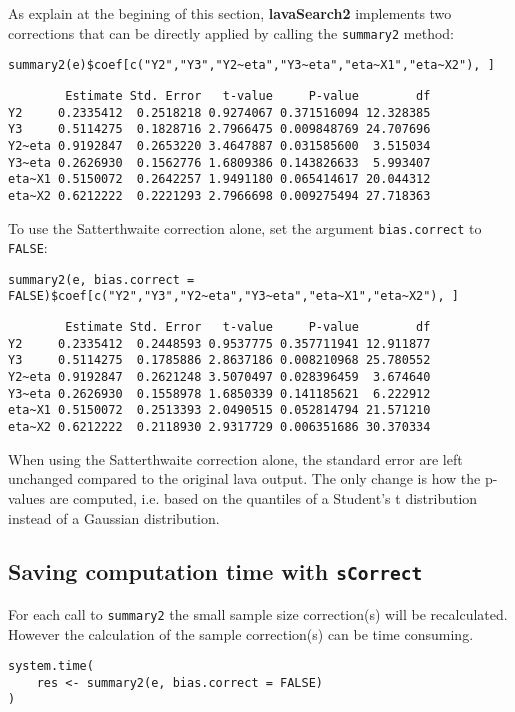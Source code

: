 \documentclass[12pt]{article}
\begin{document}
As explain at the begining of this section, \textbf{lavaSearch2} implements
two corrections that can be directly applied by calling the \texttt{summary2}
method:
\lstset{language=r,label= ,caption= ,captionpos=b,numbers=none}
\begin{lstlisting}
summary2(e)$coef[c("Y2","Y3","Y2~eta","Y3~eta","eta~X1","eta~X2"), ]
\end{lstlisting}

\begin{verbatim}
        Estimate Std. Error   t-value     P-value        df
Y2     0.2335412  0.2518218 0.9274067 0.371516094 12.328385
Y3     0.5114275  0.1828716 2.7966475 0.009848769 24.707696
Y2~eta 0.9192847  0.2653220 3.4647887 0.031585600  3.515034
Y3~eta 0.2626930  0.1562776 1.6809386 0.143826633  5.993407
eta~X1 0.5150072  0.2642257 1.9491180 0.065414617 20.044312
eta~X2 0.6212222  0.2221293 2.7966698 0.009275494 27.718363
\end{verbatim}

To use the Satterthwaite correction alone, set the argument
  \texttt{bias.correct} to \texttt{FALSE}:

\lstset{language=r,label= ,caption= ,captionpos=b,numbers=none}
\begin{lstlisting}
summary2(e, bias.correct = FALSE)$coef[c("Y2","Y3","Y2~eta","Y3~eta","eta~X1","eta~X2"), ]
\end{lstlisting}

\begin{verbatim}
        Estimate Std. Error   t-value     P-value        df
Y2     0.2335412  0.2448593 0.9537775 0.357711941 12.911877
Y3     0.5114275  0.1785886 2.8637186 0.008210968 25.780552
Y2~eta 0.9192847  0.2621248 3.5070497 0.028396459  3.674640
Y3~eta 0.2626930  0.1558978 1.6850339 0.141185621  6.222912
eta~X1 0.5150072  0.2513393 2.0490515 0.052814794 21.571210
eta~X2 0.6212222  0.2118930 2.9317729 0.006351686 30.370334
\end{verbatim}

When using the Satterthwaite correction alone, the standard error are
left unchanged compared to the original lava output. The only change
is how the p-values are computed, i.e. based on the quantiles of a
Student's t distribution instead of a Gaussian distribution. 

\subsection{Saving computation time with \texttt{sCorrect}}
\label{sec:orgbd325f9}
For each call to \texttt{summary2} the small sample size correction(s) will
be recalculated. However the calculation of the sample correction(s)
can be time consuming.
\lstset{language=r,label= ,caption= ,captionpos=b,numbers=none}
\begin{lstlisting}
system.time(
	res <- summary2(e, bias.correct = FALSE)
)
\end{lstlisting}
\end{document}
